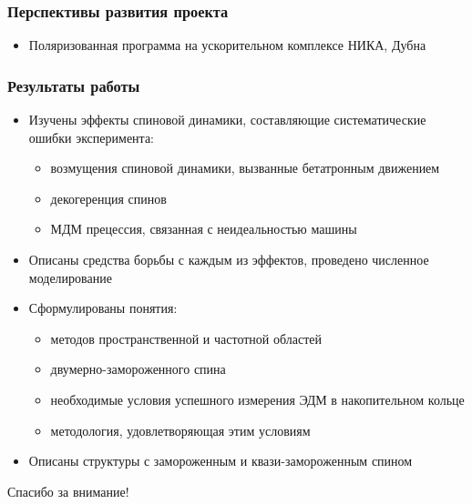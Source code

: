 \documentclass[14pt]{beamer}
\begin{document}
\begin{frame}
\frametitle{Перспективы развития проекта}
\begin{itemize}
  \item Поляризованная программа на ускорительном комплексе НИКА, Дубна
\end{itemize}
\end{frame}

\begin{frame}
\frametitle{Результаты работы}
\begin{itemize}
  \item Изучены эффекты спиновой динамики, составляющие систематические ошибки эксперимента:
  \begin{itemize}
  	\item возмущения спиновой динамики, вызванные бетатронным движением
  	\item декогеренция спинов
  	\item МДМ прецессия, связанная с неидеальностью машины
  \end{itemize}
  \item Описаны средства борьбы с каждым из эффектов, проведено численное моделирование
\end{itemize}
\end{frame}
\begin{frame}
	\begin{itemize}
		  \item Сформулированы понятия:
		\begin{itemize}
			\item методов пространственной и частотной областей
			\item двумерно-замороженного спина
			\item необходимые условия успешного измерения ЭДМ в накопительном кольце
			\item методология, удовлетворяющая этим условиям
		\end{itemize}
		\item Описаны структуры с замороженным и квази-замороженным спином
	\end{itemize}
\end{frame}

\begin{frame}
\begin{center}
Спасибо за внимание!
\end{center}
\end{frame}
\end{document}
